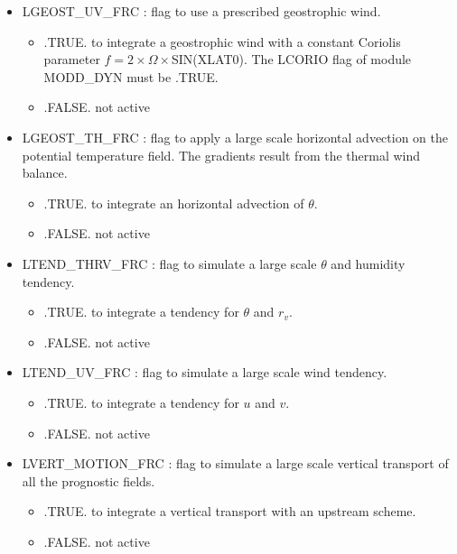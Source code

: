\begin{itemize}
\item LGEOST\_UV\_FRC : flag to use a prescribed geostrophic wind.
\begin{itemize}
\item .TRUE.  to integrate a geostrophic wind with a constant Coriolis
parameter
$f=2 \times \Omega \times $SIN(XLAT0). The LCORIO flag of module MODD\_DYN
must be .TRUE.
\item .FALSE. not active
\end{itemize}

\item LGEOST\_TH\_FRC : flag to apply a large scale horizontal advection
on the potential temperature field. The gradients result from the thermal wind
balance.
\begin{itemize}
\item .TRUE.  to integrate an horizontal advection of $\theta$.
\item .FALSE. not active
\end{itemize}

\item LTEND\_THRV\_FRC : flag to simulate a large scale $\theta$ and
humidity tendency.
\begin{itemize}
\item .TRUE.  to integrate a tendency for $\theta$ and $r_v$.
\item .FALSE. not active
\end{itemize}

\item LTEND\_UV\_FRC : flag to simulate a large scale wind tendency.
\begin{itemize}
\item .TRUE.  to integrate a tendency for $u$ and $v$.
\item .FALSE. not active
\end{itemize}

\item LVERT\_MOTION\_FRC : flag to simulate a large scale vertical transport
of all the prognostic fields.
\begin{itemize}
\item .TRUE.  to integrate a vertical transport with an upstream scheme.
\item .FALSE. not active
\end{itemize}


\end{itemize}
